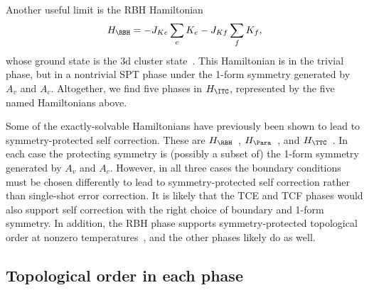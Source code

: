 Another useful limit is the RBH Hamiltonian
\begin{align}
H_\RBH = - J_{Ke} \sum_e K_e - J_{Kf} \sum_f K_f, \label{eqn:H-RBH}
\end{align}
whose ground state is the 3d cluster state~\cite{Raussendorf2005LongRange}. This Hamiltonian is in the trivial phase, but in a nontrivial SPT phase under the 1-form symmetry generated by $A_v$ and $A_c$.
Altogether, we find five phases in $H_\ITC$, represented by the five named Hamiltonians above.

Some of the exactly-solvable Hamiltonians have previously been shown to lead to symmetry-protected self correction. These are $H_\RBH$~\cite{RobertsBartlett2020}, $H_\Para$~\cite{StahlNandkishore2021}, and $H_\TTC$~\cite{Stahl2023Boundary}. In each case the protecting symmetry is (possibly a subset of) the 1-form symmetry generated by $A_v$ and $A_c$. However, in all three cases the boundary conditions must be chosen differently to lead to symmetry-protected self correction rather than single-shot error correction. It is likely that the TCE and TCF phases would also support self correction with the right choice of boundary and 1-form symmetry. In addition, the RBH phase supports symmetry-protected topological order at nonzero temperatures~\cite{Roberts2017SPTO}, and the other phases likely do as well.

\subsection{Topological order in each phase} \label{sub:topological-order}

